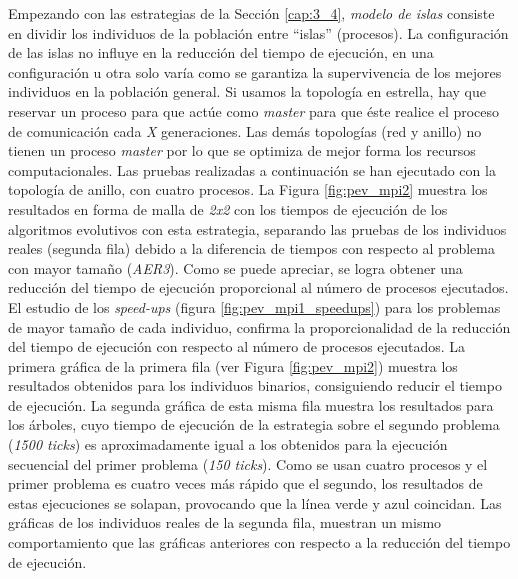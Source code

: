 Empezando con las estrategias de la Sección \ref{cap:3_4}, \textit{modelo de islas} consiste en dividir los individuos de la población entre ``islas'' (procesos). La configuración de las islas no influye en la reducción del tiempo de ejecución, en una configuración u otra solo varía como se garantiza la supervivencia de los mejores individuos en la población general. Si usamos la topología en estrella, hay que reservar un proceso para que actúe como \textit{master} para que éste realice el proceso de comunicación cada \textit{X} generaciones. Las demás topologías (red y anillo) no tienen un proceso \textit{master} por lo que se optimiza de mejor forma los recursos computacionales. Las pruebas realizadas a continuación se han ejecutado con la topología de anillo, con cuatro procesos. La Figura \ref{fig:pev_mpi2} muestra los resultados en forma de malla de \textit{2x2} con los tiempos de ejecución de los algoritmos evolutivos con esta estrategia, separando las pruebas de los individuos reales (segunda fila) debido a la diferencia de tiempos con respecto al problema con mayor tamaño (\textit{AER3}). Como se puede apreciar, se logra obtener una reducción del tiempo de ejecución proporcional al número de procesos ejecutados. El estudio de los \textit{speed-ups} (figura \ref{fig:pev_mpi1_speedups}) para los problemas de mayor tamaño de cada individuo, confirma la proporcionalidad de la reducción del tiempo de ejecución con respecto al número de procesos ejecutados. La primera gráfica de la primera fila (ver Figura \ref{fig:pev_mpi2}) muestra los resultados obtenidos para los individuos binarios, consiguiendo reducir el tiempo de ejecución. La segunda gráfica de esta misma fila muestra los resultados para los árboles, cuyo tiempo de ejecución de la estrategia sobre el segundo problema (\textit{1500 ticks}) es aproximadamente igual a los obtenidos para la ejecución secuencial del primer problema (\textit{150 ticks}). Como se usan cuatro procesos y el primer problema es cuatro veces más rápido que el segundo, los resultados de estas ejecuciones se solapan, provocando que la línea verde y azul coincidan. Las gráficas de los individuos reales de la segunda fila, muestran un mismo comportamiento que las gráficas anteriores con respecto a la reducción del tiempo de ejecución.




